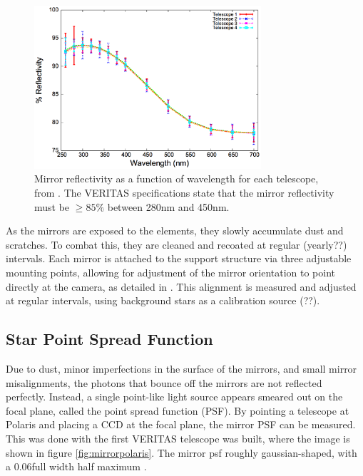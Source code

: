 \begin{figure}[ht]
  \begin{center}
    \includegraphics[width=0.75\textwidth]{images/mirror_reflect}
    \caption[Mirror Reflectivity]{Mirror reflectivity as a function of wavelength for each telescope, from \cite{mirrorfacets}.  The VERITAS specifications state that the mirror reflectivity must be $\geq 85\%$ between 280nm and 450nm.}\label{fig:mirreflect}
  \end{center}
\end{figure}

As the mirrors are exposed to the elements, they slowly accumulate dust and scratches.
To combat this, they are cleaned and recoated at regular (yearly??) intervals.
Each mirror is attached to the support structure via three adjustable mounting points, allowing for adjustment of the mirror orientation to point directly at the camera, as detailed in \cite{mirroralign}.
This alignment is measured and adjusted at regular intervals, using background stars as a calibration source (??).


\subsection{Star Point Spread Function}

Due to dust, minor imperfections in the surface of the mirrors, and small mirror misalignments, the photons that bounce off the mirrors are not reflected perfectly.
Instead, a single point-like light source appears smeared out on the focal plane, called the point spread function (PSF).
By pointing a telescope at Polaris and placing a CCD at the focal plane, the mirror PSF can be measured.
This was done with the first VERITAS telescope was built, where the image is shown in figure \ref{fig:mirrorpolaris}.
The mirror psf roughly gaussian-shaped, with a 0.06\degree full width half maximum \cite{Veritas_Detector}.

